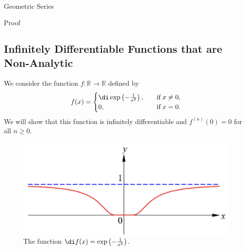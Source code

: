\begin{example}[label=230305_16]{Geometric Series}
\begin{example}[label=230304_9]{}
\begin{example}{}
\begin{example}{}
\begin{myproof}{Proof}
\end{myproof}

\bigskip
\subsection{ Infinitely Differentiable Functions that are Non-Analytic}\label{sec6.6.3}
We consider the function $f:\mathbb{R}\to\mathbb{R}$ defined by
\begin{equation*} f(x)=\begin{cases}\di\exp\left(-\frac{1}{x^2}\right),\quad &\text{if}\;x\neq 0,\\0,\quad &\text{if}\;x=0.\end{cases}\end{equation*}
We will show that this function  is infinitely differentiable and $f^{(n)}(0)=0$ for all $n\geq 0$. 
 
\begin{figure}[ht]
\centering
\includegraphics[scale=0.2]{Picture58.png}
\caption{The function $\di f(x)=\exp\left(-\frac{1}{x^2}\right)$.\fa}\label{figure58}
\end{figure}



\end{example}
\end{example}
\end{example}
\end{example}
